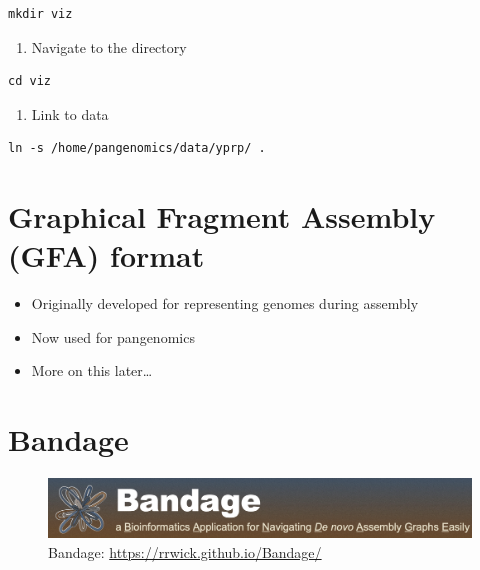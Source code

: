 \documentclass[
]{book}
\providecommand{\tightlist}{%
  \setlength{\itemsep}{0pt}\setlength{\parskip}{0pt}}
\begin{document}
\begin{verbatim}
mkdir viz
\end{verbatim}

\begin{enumerate}
\def\labelenumi{\arabic{enumi}.}
\setcounter{enumi}{2}
\tightlist
\item
  Navigate to the directory
\end{enumerate}

\begin{verbatim}
cd viz
\end{verbatim}

\begin{enumerate}
\def\labelenumi{\arabic{enumi}.}
\setcounter{enumi}{3}
\tightlist
\item
  Link to data
\end{enumerate}

\begin{verbatim}
ln -s /home/pangenomics/data/yprp/ .
\end{verbatim}

\hypertarget{graphical-fragment-assembly-gfa-format}{%
\section{Graphical Fragment Assembly (GFA) format}\label{graphical-fragment-assembly-gfa-format}}

\begin{itemize}
\tightlist
\item
  Originally developed for representing genomes during assembly
\item
  Now used for pangenomics
\item
  More on this later\ldots{}
\end{itemize}

\hypertarget{bandage}{%
\section{Bandage}\label{bandage}}

\begin{figure}
\centering
\includegraphics[width=1\textwidth,height=\textheight]{./Figures/Bandage.png}
\caption{Bandage: \url{https://rrwick.github.io/Bandage/}}
\end{figure}
\end{document}
